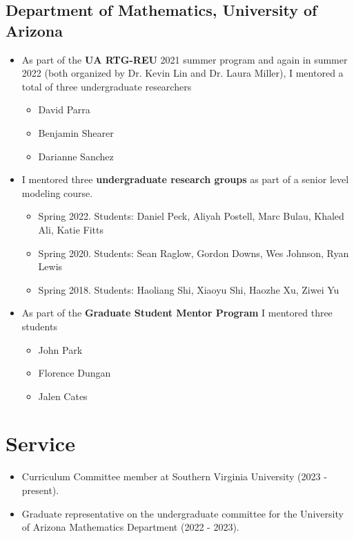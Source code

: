 \documentclass{article}
\begin{document}
\subsection*{Department of Mathematics, University of Arizona}
\begin{itemize}
    \item As part of the \textbf{UA RTG-REU} 2021 summer program and again in summer 2022 (both organized by Dr. Kevin Lin and Dr. Laura Miller), I mentored a total of three undergraduate researchers
    \begin{itemize}
        \item David Parra
        \item Benjamin Shearer
        \item Darianne Sanchez
    \end{itemize}
    \item I mentored three \textbf{undergraduate research groups} as part of a senior level modeling course.
    \begin{itemize}
        \item Spring 2022. Students: Daniel Peck, Aliyah Postell, Marc Bulau, Khaled Ali, Katie Fitts
        \item Spring 2020. Students: Sean Raglow, Gordon Downs, Wes Johnson, Ryan Lewis
        \item Spring 2018. Students: Haoliang Shi, Xiaoyu Shi, Haozhe Xu, Ziwei Yu
    \end{itemize}
    \item As part of the \textbf{Graduate Student Mentor Program} I mentored three students
    \begin{itemize}
        \item John Park
        \item Florence Dungan
        \item Jalen Cates
    \end{itemize}
\end{itemize}

\section*{Service}
\begin{itemize}
    \item Curriculum Committee member at Southern Virginia University (2023 - present).
    \item Graduate representative on the undergraduate committee for the University of Arizona Mathematics Department (2022 - 2023).
\end{itemize}
\end{document}
